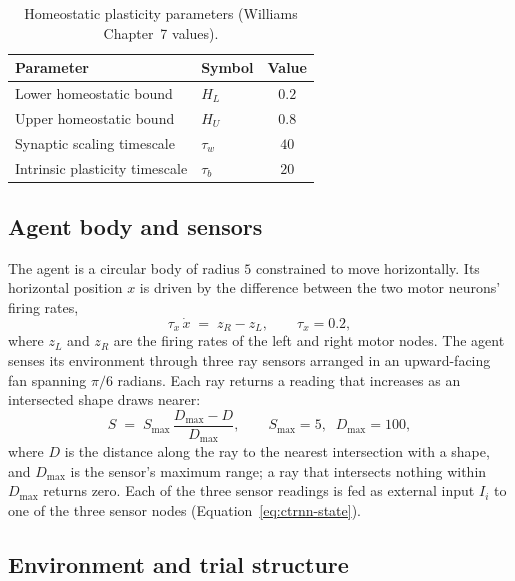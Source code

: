 \begin{table}[t]
  \centering
  \caption{Homeostatic plasticity parameters (Williams Chapter~7 values).}
  \label{tab:hp-values}
  \begin{tabular}{llc}
    \toprule
    Parameter & Symbol & Value \\
    \midrule
    Lower homeostatic bound & $H_L$    & $0.2$ \\
    Upper homeostatic bound & $H_U$    & $0.8$ \\
    Synaptic scaling timescale & $\tau_w$ & $40$ \\
    Intrinsic plasticity timescale & $\tau_b$ & $20$ \\
    \bottomrule
  \end{tabular}
\end{table}

\subsection{Agent body and sensors}
\label{sec:methods:body}

The agent is a circular body of radius $5$ constrained to move horizontally. Its
horizontal position $x$ is driven by the difference between the two motor
neurons' firing rates,
%
\begin{equation}
  \tau_x\, \dot{x} \;=\; z_R - z_L,
  \qquad \tau_x = 0.2,
  \label{eq:body}
\end{equation}
%
where $z_L$ and $z_R$ are the firing rates of the left and right motor nodes.
The agent senses its environment through three ray sensors arranged in an
upward-facing fan spanning $\pi/6$ radians. Each ray returns a reading that
increases as an intersected shape draws nearer:
%
\begin{equation}
  S \;=\; S_{\max}\,\frac{D_{\max} - D}{D_{\max}},
  \qquad S_{\max} = 5,\;\; D_{\max} = 100,
  \label{eq:sensor}
\end{equation}
%
where $D$ is the distance along the ray to the nearest intersection with a
shape, and $D_{\max}$ is the sensor's maximum range; a ray that intersects
nothing within $D_{\max}$ returns zero. Each of the three sensor readings is fed
as external input $I_i$ to one of the three sensor nodes
(Equation~\ref{eq:ctrnn-state}).

\subsection{Environment and trial structure}
\label{sec:methods:env}

